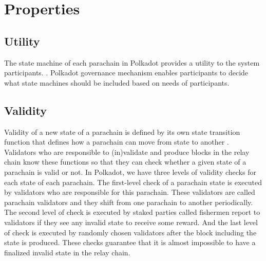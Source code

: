 \section{Properties}\label{sec:properties}

 
 \subsection{Utility}

 The state machine of each parachain in Polkadot provides a utility to the system participants. 
 .  Polkadot governance mechanism enables participants to decide what state machines should be included based on needs of participants.



 \subsection{Validity}
Validity of a new state of a parachain is defined by its own state transition function that defines how a parachain can move from  state to another .   Validators who are responsible to (in)validate and produce blocks in the relay chain  know these functions so that they can  check whether a given state of a parachain is valid or not.  In Polkadot, we have three levels of validity checks for each state of each parachain. The first-level check of a parachain state is executed by validators who are responsible for this parachain. These validators are called parachain validators and they shift from one parachain to another  periodically. The second level of check is executed by staked parties called fishermen  report to validators if they see any invalid state to receive some reward. And the last level of check is executed by randomly chosen validators after the block including the state is produced. These checks guarantee that it is almost impossible to have a finalized invalid state in the relay chain.

